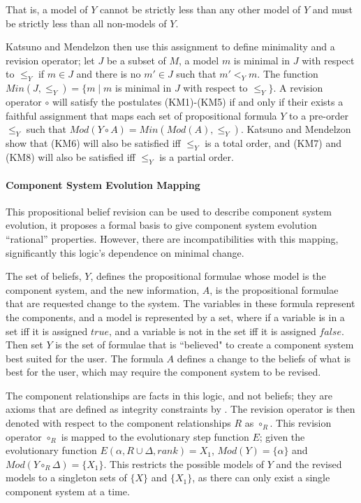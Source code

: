 That is, a model of $Y$ cannot be strictly less than any other model of $Y$ and must be strictly less than all non-models of $Y$.

Katsuno and Mendelzon then use this assignment to define minimality and a revision operator; 
let $J$ be a subset of $M$, 
a model $m$ is minimal in $J$ with respect to $\leq_{Y}$ if $m \in J$ and there is no $m' \in J$ such that $m' <_Y m$. 
The function $Min(J,\leq_{Y}) = \{ m \mid m$ is minimal in $J$ with respect to $\leq_{Y} \}$.
A revision operator $\circ$ will satisfy the postulates (KM1)-(KM5) if and only if
their exists a faithful assignment that maps each set of propositional formula $Y$ to a pre-order $\leq_{Y}$
such that $Mod(Y \circ A) = Min(Mod(A),\leq_{Y})$.
Katsuno and Mendelzon show that (KM6) will also be satisfied iff $\leq_{Y}$ is a total order,
and (KM7) and (KM8) will also be satisfied iff $\leq_{Y}$ is a partial order.

\paragraph{Component System Evolution Mapping}
This propositional belief revision can be used to describe component system evolution, it proposes a formal basis to give component system evolution ``rational'' properties.
However, there are incompatibilities with this mapping, significantly this logic's dependence on minimal change.

The set of beliefs, $Y$, defines the propositional formulae whose model is the component system,
and the new information, $A$, is the propositional formulae that are requested change to the system.
The variables in these formula represent the components, and a model is represented by a set, where if a variable is in a set iff it is assigned $true$, 
and a variable is not in the set iff it is assigned $false$. 
Then set $Y$ is the set of formulae that is ``believed" to create a component system best suited for the user.
The formula $A$ defines a change to the beliefs of what is best for the user, which may require the component system to be revised.

The component relationships are facts in this logic, and not beliefs; they are axioms that are defined as integrity constraints by \citep{katsuno1991propositional}.
The revision operator is then denoted with respect to the component relationships $R$ as $\circ_R$.
This revision operator $\circ_R$ is mapped to the evolutionary step function $E$;
given the evolutionary function $E(\alpha,R \cup \Delta,rank) = X_1$, $Mod(Y) = \{\alpha\}$ and $Mod(Y \circ_{R} \Delta) = \{X_1\}$.
This restricts the possible models of $Y$ and the revised models to a singleton sets of $\{X\}$ and $\{X_1\}$,
as there can only exist a single component system at a time.

